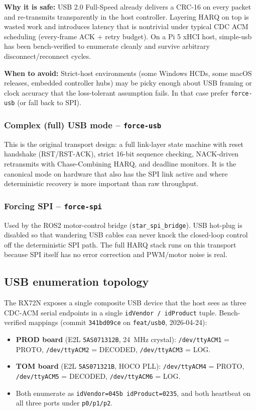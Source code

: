 \textbf{Why it is safe:} USB 2.0 Full-Speed already delivers a CRC-16
on every packet and re-transmits transparently in the host controller.
Layering HARQ on top is wasted work and introduces latency that is
nontrivial under typical CDC ACM scheduling (every-frame ACK + retry
budget). On a Pi 5 xHCI host, simple-usb has been bench-verified to
enumerate cleanly and survive arbitrary disconnect/reconnect cycles.

\textbf{When to avoid:} Strict-host environments (some Windows HCDs,
some macOS releases, embedded controller hubs) may be picky enough
about USB framing or clock accuracy that the loss-tolerant assumption
fails. In that case prefer \texttt{force-usb} (or fall back to SPI).

\subsubsection{Complex (full) USB mode -- \texttt{force-usb}}

This is the original transport design: a full link-layer state machine
with reset handshake (RST/RST-ACK), strict 16-bit sequence checking,
NACK-driven retransmits with Chase-Combining HARQ, and deadline
monitors. It is the canonical mode on hardware that also has the SPI
link active and where deterministic recovery is more important than
raw throughput.

\subsubsection{Forcing SPI -- \texttt{force-spi}}

Used by the ROS2 motor-control bridge (\texttt{star\_spi\_bridge}).
USB hot-plug is disabled so that wandering USB cables can never knock
the closed-loop control off the deterministic SPI path. The full HARQ
stack runs on this transport because SPI itself has no error
correction and PWM/motor noise is real.

\subsection{USB enumeration topology}

The RX72N exposes a single composite USB device that the host sees as
three CDC-ACM serial endpoints in a single \texttt{idVendor / idProduct}
tuple. Bench-verified mappings (commit \texttt{341bd09ce} on
\texttt{feat/usb0}, 2026-04-24):

\begin{itemize}
  \item \textbf{PROD board} (E2L \texttt{5AS071312B}, 24~MHz crystal):
        \texttt{/dev/ttyACM1} = PROTO,
        \texttt{/dev/ttyACM2} = DECODED,
        \texttt{/dev/ttyACM3} = LOG.
  \item \textbf{TOM board} (E2L \texttt{5AS071321B}, HOCO PLL):
        \texttt{/dev/ttyACM4} = PROTO,
        \texttt{/dev/ttyACM5} = DECODED,
        \texttt{/dev/ttyACM6} = LOG.
  \item Both enumerate as \texttt{idVendor=045b idProduct=0235}, and
        both heartbeat on all three ports under \texttt{p0/p1/p2}.
\end{itemize}

